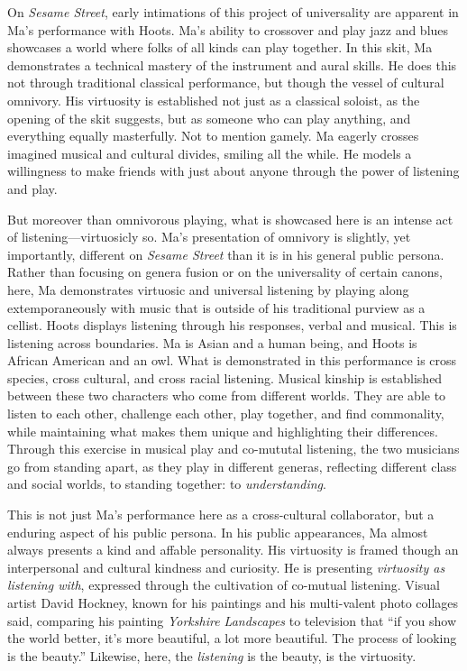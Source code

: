 \documentclass[12pt,letterpaper]{article}
\newcommand{\ses}{\textit{Sesame Street }}
\begin{document}
	On \textit{Sesame Street}, early intimations of this project of 
	universality are apparent in Ma's performance with Hoots. Ma's ability 
	to crossover and play jazz and blues showcases a world where folks of 
	all kinds can play together. In this skit, Ma demonstrates a technical 
	mastery of the instrument and
	aural skills. He does this not through traditional classical 
	performance,
	but though the vessel of cultural omnivory. His virtuosity is 
	established not just as a classical soloist, as the opening of the skit
	suggests, but as someone who can play anything, and everything equally 
	masterfully. Not to mention gamely. Ma eagerly crosses imagined musical
	and cultural divides, smiling all the while. He models a willingness to
	make friends with just about anyone through the power of listening and 
	play.

	But moreover than omnivorous playing, what is showcased here is an 
	intense
	act of listening---virtuosicly so. Ma's presentation of omnivory is 
	slightly, yet importantly, different on \ses than it is in his general
	public persona. Rather than focusing
	on genera fusion or on the universality of certain canons, here, Ma 
	demonstrates virtuosic and universal listening by playing 
	along extemporaneously with music that is outside of his traditional 
	purview as a 
	cellist. Hoots displays listening through his responses, verbal and 
	musical. This is listening across boundaries. Ma is Asian and a human 
	being, and Hoots is African American and an owl. What is demonstrated 
	in this performance is cross species, cross cultural, and cross racial 
	listening. Musical kinship is established between these two characters 
	who come from different worlds. They are able to listen to each other, 
	challenge each other, play together, and find commonality, while 
	maintaining what makes them unique and highlighting their differences. 
	Through this exercise in musical play and co-mututal listening, the two
	musicians go from standing apart, as they play in different generas, 
	reflecting different class and social worlds, to standing together: to 
	\textit{understanding}.

	This is not just Ma's performance here as a cross-cultural collaborator,
	but a enduring aspect of his public persona. In his public appearances,
	Ma almost always presents a kind and affable personality. His virtuosity
	is framed though an interpersonal and cultural kindness and curiosity. 
	He is presenting \textit{virtuosity as listening with}, expressed
	through the
	cultivation of co-mutual listening.
	Visual artist David Hockney, known for his paintings and his 
	multi-valent photo collages said, comparing his painting 
	\textit{Yorkshire 
	Landscapes} to television that ``if you show the world better, it's more
	beautiful, a lot more beautiful. The process of looking is the 
	beauty.''\autocite[100]{Odell} Likewise, here, the \textit{listening} is
	the beauty, is the virtuosity.  
\end{document}
